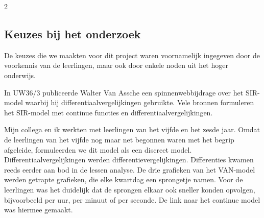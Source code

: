 \eindewerktekst



\begin{multicols}{2}

\subsection{Keuzes bij het onderzoek}

De keuzes die we maakten voor dit project waren voornamelijk ingegeven door de voorkennis van de leerlingen, maar ook door enkele noden uit het hoger onderwijs.


In UW36/3 publiceerde Walter Van Assche een spinnenwebbijdrage over het SIR-model waarbij hij differentiaalvergelijkingen gebruikte. Vele bronnen formuleren het SIR-model met continue functies en differentiaalvergelijkingen. 

Mijn collega en ik werkten met leerlingen van het vijfde en het zesde jaar. Omdat de leerlingen van het vijfde nog maar net begonnen waren met het begrip afgeleide, formuleerden we dit model als een discreet model. Differentiaalvergelijkingen werden differentievergelijkingen. Differenties kwamen reeds eerder aan bod in de lessen analyse. De drie grafieken van het VAN-model werden getrapte grafieken, die elke kwartdag een sprongetje namen. Voor de leerlingen was het duidelijk dat de sprongen elkaar ook sneller konden opvolgen, bijvoorbeeld per uur, per minuut of per seconde. De link naar het continue model was hiermee gemaakt.

\end{multicols}


